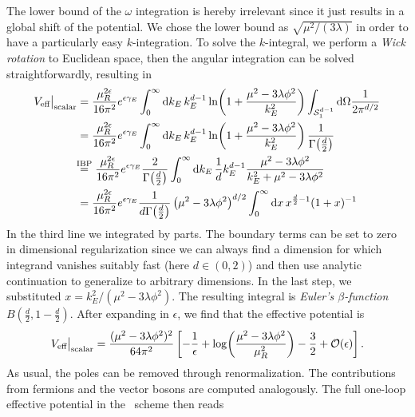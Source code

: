 The lower bound of the $\omega$ integration is hereby irrelevant since it just results in a global shift of the potential. We chose the lower bound as $\sqrt{\mu^2/(3 \lambda)}$ in order to have a particularly easy $k$-integration. To solve the $k$-integral, we perform a \textit{Wick rotation} to Euclidean space, then the angular integration can be solved straightforwardly, resulting in
\begin{equation}
\begin{split}
V_\text{eff}\big \vert_{\text{scalar}} &= \frac{\mu_R^{2 \epsilon}}{16 \pi^2} e^{\epsilon \gamma_E} \int_0^\infty \mathrm{d} k_E\, k_E^{d - 1}\ln\! \left(1 + \frac{\mu^2 - 3 \lambda \phi^2}{k_E^2} \right) \int_{\mathcal{S}_1^{d - 1}} \mathrm{d} \Omega \frac{1}{2 \pi^{d/2}}  \\
& = \frac{\mu_R^{2 \epsilon}}{16 \pi^2} e^{\epsilon \gamma_E} \int_0^\infty \mathrm{d} k_E\, k_E^{d - 1} \ln\! \left(1 + \frac{\mu^2 - 3 \lambda \phi^2}{k_E^2} \right) \frac{1}{\Gamma\! \left(\frac{d}{2} \right)} \\
&\hspace{-1.1mm}\stackrel{\text{IBP}}{=}  \frac{\mu_R^{2 \epsilon}}{16 \pi^2} e^{\epsilon \gamma_E} \frac{2}{\Gamma\! \left(\frac{d}{2} \right)} \int_0^\infty \mathrm{d} k_E\, \frac{1}{d} k_E^{d - 1} \frac{\mu^2 - 3 \lambda \phi^2}{k_E^2 + \mu^2 - 3 \lambda \phi^2} \\
& =  \frac{\mu_R^{2 \epsilon}}{16 \pi^2} e^{\epsilon \gamma_E} \frac{1}{d \Gamma\! \left(\frac{d}{2} \right)} \left(\mu^2 - 3 \lambda \phi^2 \right)^{d/2} \int_0^\infty \mathrm{d} x\, x^{\frac{d}{2} - 1} (1 + x)^{-1}
\end{split}
\end{equation}
In the third line we integrated by parts. The boundary terms can be set to zero in dimensional regularization since we can always find a dimension for which integrand vanishes suitably fast (here $d \in (0, 2)$) and then use analytic continuation to generalize to arbitrary dimensions. In the last step, we substituted $x = k_E^2/(\mu^2 - 3 \lambda \phi^2)$. The resulting integral is \textit{Euler's $\beta$-function} $B\left(\frac{d}{2}, 1 - \frac{d}{2} \right)$. After expanding in $\epsilon$, we find that the effective potential is
\begin{equation}
V_{\text{eff}}\big \vert_{\text{scalar}} = \frac{(\mu^2 - 3 \lambda \phi^2)^2}{64 \pi^2} \left[ - \frac{1}{\epsilon} + \log\! \left( \frac{\mu^2 - 3 \lambda \phi^2}{\mu_R^2} \right) - \frac{3}{2} + \mathcal{O}\!\left(\epsilon\right) \right].
\end{equation}
As usual, the poles can be removed through renormalization. The contributions from fermions and the vector bosons are computed analogously. The full one-loop effective potential in the \MS\ scheme then reads
